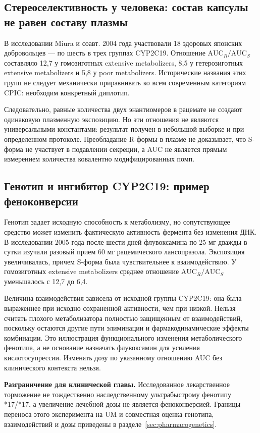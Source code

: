 \documentclass[11pt,a4paper,notitlepage]{report}
\newcommand{\src}[1]{\unskip\space\cite{#1}}
\begin{document}
\subsection{Стереоселективность у человека: состав капсулы не равен составу плазмы}
В исследовании Miura и соавт. 2004 года участвовали 18 здоровых японских добровольцев --- по шесть в трех группах CYP2C19. Отношение $\mathrm{AUC}_R/\mathrm{AUC}_S$ составляло 12,7 у гомозиготных extensive metabolizers, 8,5 у гетерозиготных extensive metabolizers и 5,8 у poor metabolizers. Исторические названия этих групп не следует механически приравнивать ко всем современным категориям CPIC: необходим конкретный диплотип.\src{molhumanstereo,cpic}

Следовательно, равные количества двух энантиомеров в рацемате не создают одинаковую плазменную экспозицию. Но эти отношения не являются универсальными константами: результат получен в небольшой выборке и при определенном протоколе. Преобладание R-формы в плазме не доказывает, что S-форма не участвует в подавлении секреции, а AUC не является прямым измерением количества ковалентно модифицированных помп.\src{molhumanstereo,molcys}

\subsection{Генотип и ингибитор CYP2C19: пример феноконверсии}
\label{sec:phenoconversion}
Генотип задает исходную способность к метаболизму, но сопутствующее средство может изменить фактическую активность фермента без изменения ДНК. В исследовании 2005 года после шести дней флувоксамина по 25 мг дважды в сутки изучали разовый прием 60 мг рацемического лансопразола. Экспозиция увеличивалась, причем S-форма была чувствительнее к взаимодействию. У гомозиготных extensive metabolizers среднее отношение $\mathrm{AUC}_R/\mathrm{AUC}_S$ уменьшалось с 12,7 до 6,4.\src{molfluvox}

Величина взаимодействия зависела от исходной группы CYP2C19: она была выраженнее при исходно сохраненной активности, чем при низкой. Нельзя считать плохого метаболизатора полностью защищенным от взаимодействий, поскольку остаются другие пути элиминации и фармакодинамические эффекты комбинации. Это иллюстрация функционального изменения метаболического фенотипа, а не основание назначать флувоксамин для усиления кислотосупрессии. Изменять дозу по указанному отношению AUC без клинического контекста нельзя.\src{molfluvox,cpic}

\textbf{Разграничение для клинической главы.} Исследованное лекарственное торможение не тождественно наследственному ультрабыстрому фенотипу *17/*17, а увеличение лечебной дозы не является феноконверсией. Границы переноса этого эксперимента на UM и совместная оценка генотипа, взаимодействий и дозы приведены в разделе~\ref{sec:pharmacogenetics}.\src{molfluvox,cpic}
\end{document}
